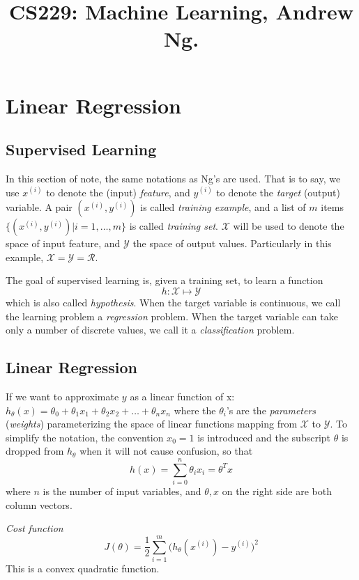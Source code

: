 \title{CS229: Machine Learning, Andrew Ng.}

\section{Linear Regression}

\subsection{Supervised Learning}

 In this section of note, the same notations as Ng's are used.
 That is to say, we use $x^{(i)}$ to denote the (input) \emph{feature},
 and $y^{(i)}$ to denote the \emph{target} (output) variable.
 A pair $(x^{(i)}, y^{(i)})$ is called \emph{training example},
 and a list of $m$ items $\big\{(x^{(i)}, y^{(i)}) | i = 1, \ldots, m\big\} $
 is called \emph{training set}. $\mathcal{X}$ will be used to denote the space of
 input feature, and $\mathcal{Y}$ the space of output values.
 Particularly in this example, $\mathcal{X} = \mathcal{Y} = \mathcal{R} $.
 
 The goal of supervised learning is, given a training set, to learn a function
 \[ h : \mathcal{X} \mapsto \mathcal{Y}\]
 which is also called \emph{hypothesis}. When the target variable is
 continuous, we call the learning problem a \emph{regression} problem.
 When the target variable can take only a number of discrete values,
 we call it a \emph{classification} problem.

\subsection{Linear Regression}

 If we want to approximate $y$ as a linear function of x: 
 $h_\theta(x) = \theta_0 + \theta_1 x_1 + \theta_2 x_2 + \ldots + \theta_n x_n$
 where the $\theta_i$'s are the \emph{parameters} (\emph{weights})
 parameterizing the space of linear functions mapping from $\mathcal{X}$ to
 $\mathcal{Y}$.
 To simplify the notation, the convention $x_0 = 1$ is introduced and the
 subscript $\theta$ is dropped from $h_\theta$ when it will not cause confusion,
 so that \[ h(x) = \sum_{i=0}^n \theta_i x_i = \theta^T x\]
 where $n$ is the number of input variables, and $\theta, x$ on the right side
 are both column vectors.

 \emph{Cost function}
 \[ J(\theta) =
   \frac{1}{2} \sum_{i=1}^m \big( h_\theta(x^{(i)}) - y^{(i)} \big)^2\]
 This is a convex quadratic function.

